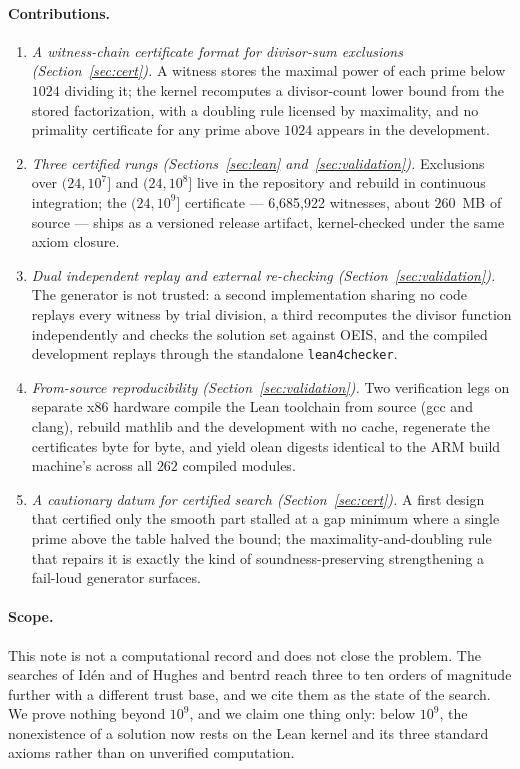 \documentclass[11pt]{article}
\newcommand{\lean}[1]{\texttt{#1}}
\begin{document}
\paragraph{Contributions.}
\begin{enumerate}
\item \emph{A witness-chain certificate format for divisor-sum
exclusions (Section~\ref{sec:cert}).} A witness stores the maximal
power of each prime below $1024$ dividing it; the kernel recomputes a
divisor-count lower bound from the stored factorization, with a
doubling rule licensed by maximality, and no primality certificate for
any prime above $1024$ appears in the development.
\item \emph{Three certified rungs (Sections~\ref{sec:lean}
and~\ref{sec:validation}).} Exclusions over $(24, 10^7]$ and
$(24, 10^8]$ live in the repository and rebuild in continuous
integration; the $(24, 10^9]$ certificate --- 6{,}685{,}922 witnesses,
about $260$~MB of source --- ships as a versioned release artifact,
kernel-checked under the same axiom closure.
\item \emph{Dual independent replay and external re-checking
(Section~\ref{sec:validation}).} The generator is not trusted: a second
implementation sharing no code replays every witness by trial division,
a third recomputes the divisor function independently and checks the
solution set against OEIS, and the compiled development replays through
the standalone \lean{lean4checker}.
\item \emph{From-source reproducibility (Section~\ref{sec:validation}).}
Two verification legs on separate x86 hardware compile the Lean
toolchain from source (gcc and clang), rebuild mathlib and the
development with no cache, regenerate the certificates byte for byte,
and yield olean digests identical to the ARM build machine's across all
$262$ compiled modules.
\item \emph{A cautionary datum for certified search
(Section~\ref{sec:cert}).} A first design that certified only the
smooth part stalled at a gap minimum where a single prime above the
table halved the bound; the maximality-and-doubling rule that repairs
it is exactly the kind of soundness-preserving strengthening a
fail-loud generator surfaces.
\end{enumerate}

\paragraph{Scope.}
This note is not a computational record and does not close the problem.
The searches of Id\'en and of Hughes and bentrd reach three to ten
orders of magnitude further with a different trust base, and we cite
them as the state of the search. We prove nothing beyond $10^9$, and we
claim one thing only: below $10^9$, the nonexistence of a solution now
rests on the Lean kernel and its three standard axioms rather than on
unverified computation.
\end{document}
